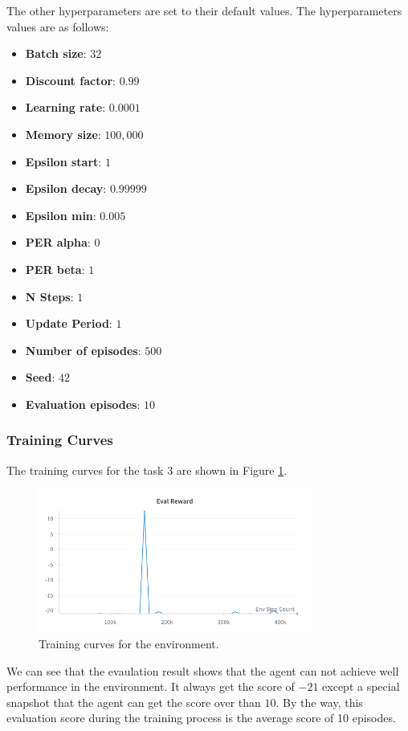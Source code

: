 The other hyperparameters are set to their default values.
The hyperparameters values are as follows:
\begin{itemize}
    \item \textbf{Batch size}: $32$
    \item \textbf{Discount factor}: $0.99$
    \item \textbf{Learning rate}: $0.0001$
    \item \textbf{Memory size}: $100,000$
    \item \textbf{Epsilon start}: $1$
    \item \textbf{Epsilon decay}: $0.99999$
    \item \textbf{Epsilon min}: $0.005$
    \item \textbf{PER alpha}: $0$
    \item \textbf{PER beta}: $1$
    \item \textbf{N Steps}: $1$
    \item \textbf{Update Period}: $1$
    \item \textbf{Number of episodes}: $500$
    \item \textbf{Seed}: $42$
    \item \textbf{Evaluation episodes}: $10$
\end{itemize}

\subsubsection{Training Curves}

The training curves for the task 3 are shown in Figure \ref{fig:pong-task3-training-curve}.
\begin{figure}[H]
    \centering
    \includegraphics[width=0.8\textwidth]{figures/task3.png}
    \caption{Training curves for the \pong environment.}
    \label{fig:pong-task3-training-curve}
\end{figure}

We can see that the evaulation result shows that the agent can not achieve well performance in the \pong environment. It always get the score of $-21$ except a special snapshot that the agent can get the score over than $10$.
By the way, this evaluation score during the training process is the average score of 10 episodes.

